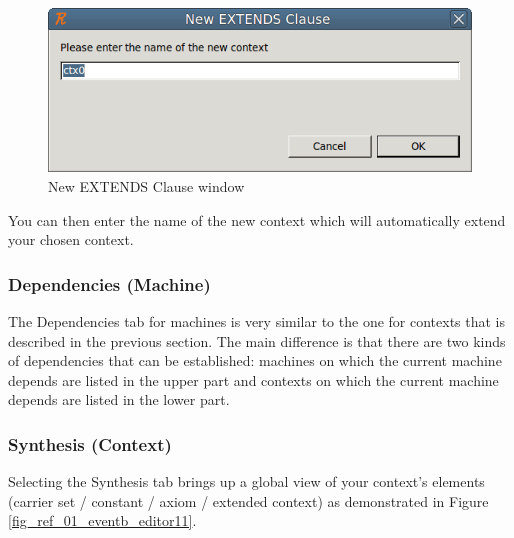 \begin{figure}[!ht]
\begin{center}
	\includegraphics{img/reference/ref_01_eventb_editor9.png}
	\caption{New EXTENDS Clause window}
	\label{fig_ref_01_eventb_editor9}
\end{center}
\end{figure}

You can then enter the name of the new context which will automatically extend your chosen context. 

\subsubsection{Dependencies (Machine)}

The \textsf{Dependencies} tab for machines is very similar to the one for contexts that is described in the previous section. The main difference is that there are two kinds of dependencies that can be established: machines on which the current machine depends are listed in the upper part and contexts on which the current machine depends are listed in the lower part.

\subsubsection{Synthesis (Context)}

Selecting the \textsf{Synthesis} tab brings up a global view of your context's elements (carrier set / constant / axiom / extended context) as demonstrated in Figure \ref{fig_ref_01_eventb_editor11}. 

